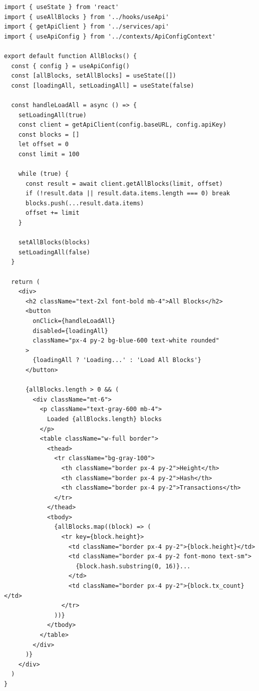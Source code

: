 \begin{listing}[htbp]
\caption{Bulk loading pattern --- all blocks or transactions}
\label{lst:ch21-bulk-load}
\begin{verbatim}
import { useState } from 'react'
import { useAllBlocks } from '../hooks/useApi'
import { getApiClient } from '../services/api'
import { useApiConfig } from '../contexts/ApiConfigContext'

export default function AllBlocks() {
  const { config } = useApiConfig()
  const [allBlocks, setAllBlocks] = useState([])
  const [loadingAll, setLoadingAll] = useState(false)

  const handleLoadAll = async () => {
    setLoadingAll(true)
    const client = getApiClient(config.baseURL, config.apiKey)
    const blocks = []
    let offset = 0
    const limit = 100

    while (true) {
      const result = await client.getAllBlocks(limit, offset)
      if (!result.data || result.data.items.length === 0) break
      blocks.push(...result.data.items)
      offset += limit
    }

    setAllBlocks(blocks)
    setLoadingAll(false)
  }

  return (
    <div>
      <h2 className="text-2xl font-bold mb-4">All Blocks</h2>
      <button
        onClick={handleLoadAll}
        disabled={loadingAll}
        className="px-4 py-2 bg-blue-600 text-white rounded"
      >
        {loadingAll ? 'Loading...' : 'Load All Blocks'}
      </button>

      {allBlocks.length > 0 && (
        <div className="mt-6">
          <p className="text-gray-600 mb-4">
            Loaded {allBlocks.length} blocks
          </p>
          <table className="w-full border">
            <thead>
              <tr className="bg-gray-100">
                <th className="border px-4 py-2">Height</th>
                <th className="border px-4 py-2">Hash</th>
                <th className="border px-4 py-2">Transactions</th>
              </tr>
            </thead>
            <tbody>
              {allBlocks.map((block) => (
                <tr key={block.height}>
                  <td className="border px-4 py-2">{block.height}</td>
                  <td className="border px-4 py-2 font-mono text-sm">
                    {block.hash.substring(0, 16)}...
                  </td>
                  <td className="border px-4 py-2">{block.tx_count}</td>
                </tr>
              ))}
            </tbody>
          </table>
        </div>
      )}
    </div>
  )
}
\end{verbatim}
\end{listing}

